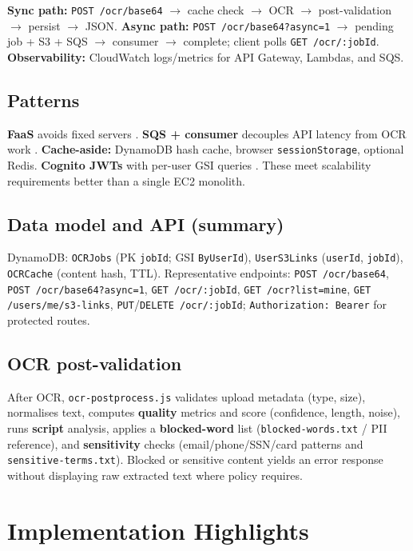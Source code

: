 \documentclass[conference]{IEEEtran}
\begin{document}
\textbf{Sync path:} \texttt{POST /ocr/base64} $\rightarrow$ cache check $\rightarrow$ OCR $\rightarrow$ post-validation $\rightarrow$ persist $\rightarrow$ JSON. \textbf{Async path:} \texttt{POST /ocr/base64?async=1} $\rightarrow$ pending job + S3 + SQS $\rightarrow$ consumer $\rightarrow$ complete; client polls \texttt{GET /ocr/:jobId}. \textbf{Observability:} CloudWatch logs/metrics for API Gateway, Lambdas, and SQS.

\subsection{Patterns}
\textbf{FaaS} avoids fixed servers \cite{aws-lambda}. \textbf{SQS + consumer} decouples API latency from OCR work \cite{eip}. \textbf{Cache-aside:} DynamoDB hash cache, browser \texttt{sessionStorage}, optional Redis. \textbf{Cognito JWTs} with per-user GSI queries \cite{cognito}. These meet scalability requirements better than a single EC2 monolith.

\subsection{Data model and API (summary)}
DynamoDB: \texttt{OCRJobs} (PK \texttt{jobId}; GSI \texttt{ByUserId}), \texttt{UserS3Links} (\texttt{userId}, \texttt{jobId}), \texttt{OCRCache} (content hash, TTL). Representative endpoints: \texttt{POST /ocr/base64}, \texttt{POST /ocr/base64?async=1}, \texttt{GET /ocr/:jobId}, \texttt{GET /ocr?list=mine}, \texttt{GET /users/me/s3-links}, \texttt{PUT}/\texttt{DELETE /ocr/:jobId}; \texttt{Authorization: Bearer} for protected routes.

\subsection{OCR post-validation}
After OCR, \texttt{ocr-postprocess.js} validates upload metadata (type, size), normalises text, computes \textbf{quality} metrics and score (confidence, length, noise), runs \textbf{script} analysis, applies a \textbf{blocked-word} list (\texttt{blocked-words.txt} / PII reference), and \textbf{sensitivity} checks (email/phone/SSN/card patterns and \texttt{sensitive-terms.txt}). Blocked or sensitive content yields an error response without displaying raw extracted text where policy requires.

\section{Implementation Highlights}
\end{document}
